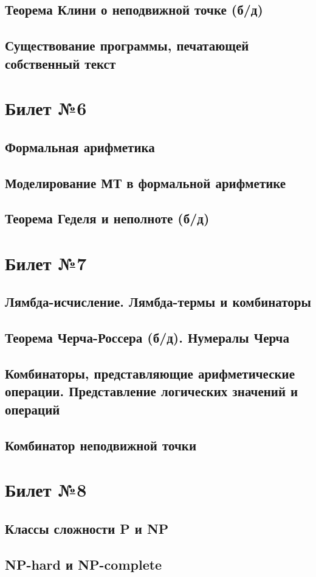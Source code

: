 \documentclass[a4paper]{article}
\begin{document}
\subsection{Теорема Клини о неподвижной точке (б/д)}
\subsection{Существование программы, печатающей собственный текст}

\section{Билет №6}
\subsection{Формальная арифметика}
\subsection{Моделирование МТ в формальной арифметике}
\subsection{Теорема Геделя и неполноте (б/д)}

\section{Билет №7}
\subsection{Лямбда-исчисление. Лямбда-термы и комбинаторы}
\subsection{Теорема Черча-Россера (б/д). Нумералы Черча}
\subsection{Комбинаторы, представляющие арифметические операции. Представление логических значений и операций}
\subsection{Комбинатор неподвижной точки}

\section{Билет №8}
\subsection{Классы сложности P и NP}
\subsection{NP-hard и NP-complete}
\end{document}
